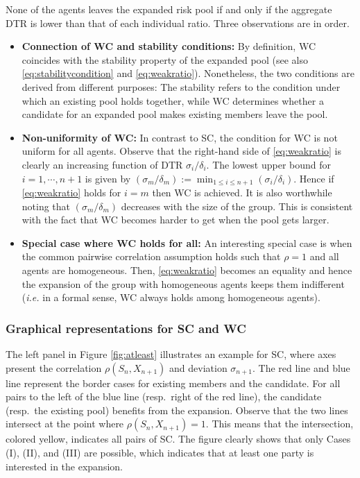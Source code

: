\documentclass[fleqn,mnsc,nonblindrev]{informs4}
\begin{document}
None of the agents leaves the expanded risk pool if and only if the aggregate DTR is lower than that of each individual ratio. Three observations are in order. 
\begin{itemize}
\item {\bf Connection of WC and stability conditions:}
By definition, WC coincides with the stability property of the expanded pool (see also  \eqref{eq:stabilitycondition} and \eqref{eq:weakratio}). Nonetheless, the two conditions are derived from different purposes: The stability refers to the condition under which an existing pool holds together, while WC determines whether a candidate for an expanded pool makes existing members leave the pool. 

\item {\bf Non-uniformity of WC:} In contrast to SC, the condition for WC is not uniform for all agents. Observe that the right-hand side of \eqref{eq:weakratio} is clearly an increasing function of DTR $\sigma_i/\delta_i$. The lowest upper bound for $i=1,\cdots, n+1$ is given by $(\sigma_m/\delta_m):=\min_{1\leq i\leq n+1}(\sigma_i/\delta_i)$. Hence if \eqref{eq:weakratio} holds for $i=m$ then WC is achieved. It is also worthwhile noting that $(\sigma_m/\delta_m)$ decreases with the size of the group. This is consistent with the fact that WC becomes harder to get when the pool gets larger.
\item {\bf Special case where WC holds for all:} An interesting special case is when the common pairwise correlation assumption holds  {such that $
\rho=1$} and all agents are homogeneous. Then, \eqref{eq:weakratio} becomes an equality and hence the expansion of the group with homogeneous agents keeps them indifferent (\textit{i.e.} in a formal sense, WC always holds among homogeneous agents).
\end{itemize}

\subsubsection*{Graphical representations for SC and WC}
  {The left panel in Figure \ref{fig:atleast} illustrates an example for SC,} where axes present the correlation $\rho(S_n,X_{n+1})$ and deviation $\sigma_{n+1}$. The red line and blue line represent the border cases for existing members and the candidate.  For all pairs to the left of the blue line (resp.~right of the red line), the candidate (resp.~the existing pool) benefits from the expansion. Observe that the two lines intersect at the point where $\rho(S_n, X_{n+1})=1$. This means that the intersection, colored yellow, indicates all pairs of SC.  The figure clearly shows that only Cases (I), (II), and (III) are possible, which indicates that at least one party is interested in the expansion. 
\end{document}
